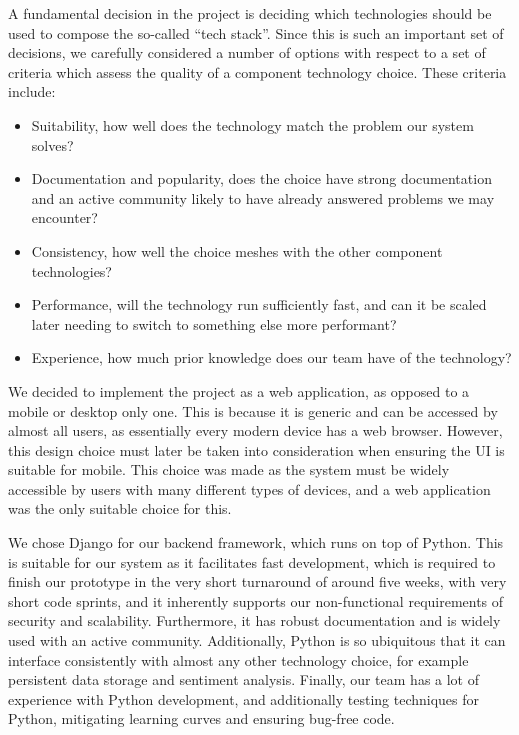 \documentclass[10pt]{article}
\begin{document}
A fundamental decision in the project is deciding which technologies should be
used to compose the so-called “tech stack”. Since this is such an important set
of decisions, we carefully considered a number of options with respect to a set
of criteria which assess the quality of a component technology choice. These
criteria include:\\ 
\begin{itemize}
    \item Suitability, how well does the technology match the problem
our system solves? 
    \item Documentation and popularity, does the choice have strong
documentation and an active community likely to have already answered problems
we may encounter? 
    \item Consistency, how well the choice meshes with the other
component technologies? 
    \item Performance, will the technology run sufficiently fast,
and can it be scaled later needing to switch to something else more performant?
    \item Experience, how much prior knowledge does our team have of the technology? 
\end{itemize}

We decided to implement the project as a web application, as opposed to a mobile or
desktop only one. This is because it is generic and can be accessed by almost
all users, as essentially every modern device has a web browser. However, this
design choice must later be taken into consideration when ensuring the UI is
suitable for mobile. This choice was made as the system must be widely
accessible by users with many different types of devices, and a web application
was the only suitable choice for this.

We chose Django for our backend framework, which runs on top of Python. This is
suitable for our system as it facilitates fast development, which is required to
finish our prototype in the very short turnaround of around five weeks, with
very short code sprints, and it inherently supports our non-functional
requirements of security and scalability. Furthermore, it has robust
documentation and is widely used with an active community. Additionally, Python
is so ubiquitous that it can interface consistently with almost any other
technology choice, for example persistent data storage and sentiment analysis.
Finally, our team has a lot of experience with Python development, and
additionally testing techniques for Python, mitigating learning curves and
ensuring bug-free code.
\end{document}
